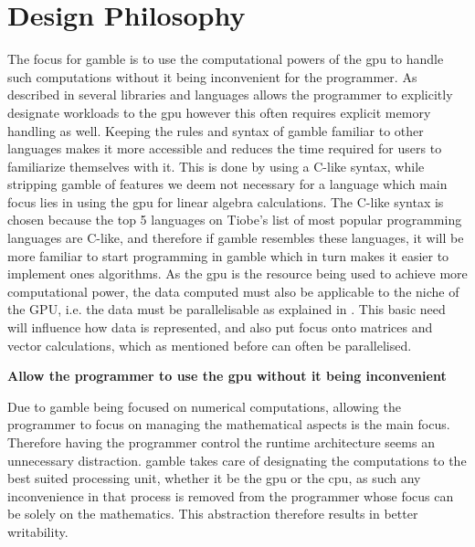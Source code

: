 \section{Design Philosophy}\label{sec:phil}

The focus for \gls{gamble} is to use the computational powers of the \acrshort{gpu} to handle such computations without it being inconvenient for the programmer.
As described in  several libraries and languages allows the programmer to explicitly designate workloads to the \acrshort{gpu} however this often requires explicit memory handling as well.
Keeping the rules and syntax of \gls{gamble} familiar to other languages makes it more accessible and reduces the time required for users to familiarize themselves with it.
This is done by using a C-like syntax, while stripping \gls{gamble} of features we deem not necessary for a language which main focus lies in using the \acrshort{gpu} for  linear algebra calculations.
The C-like syntax is chosen because the top 5 languages on Tiobe's list of most popular programming languages are C-like, and therefore if \gls{gamble} resembles these languages, it will be more familiar to start programming in \gls{gamble} which in turn makes it easier to implement ones algorithms.\citep{TIOBE}
As the \acrshort{gpu} is the resource being used to achieve more computational power, the data computed must also be applicable to the niche of the GPU, i.e. the data must be parallelisable as explained in .
This basic need will influence how data is represented, and also put focus onto matrices and vector calculations, which as mentioned before can often be parallelised.

\textbf{Allow the programmer to use the \acrshort{gpu} without it being inconvenient}

Due to \gls{gamble} being focused on numerical computations, allowing the programmer to focus on managing the mathematical aspects is the main focus.
Therefore having the programmer control the runtime architecture seems an unnecessary distraction.
\gls{gamble} takes care of designating the computations to the best suited processing unit, whether it be the \acrshort{gpu} or the \acrshort{cpu}, as such any inconvenience in that process is removed from the programmer whose focus can be solely on the mathematics.
This abstraction therefore results in better writability.

